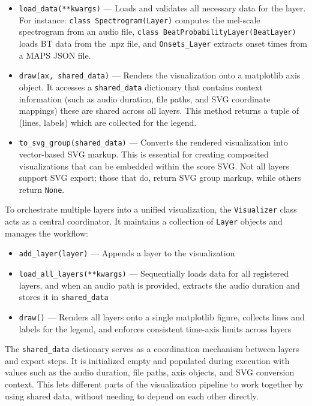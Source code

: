 \begin{itemize}
    \item \texttt{load\_data(**kwargs)} — Loads and validates all necessary data for the layer. For instance: \texttt{class Spectrogram(Layer)} computes the mel-scale spectrogram from an audio file, \texttt{class BeatProbabilityLayer(BeatLayer)} loads BT data from the .npz file, and \texttt{Onsets\_Layer} extracts onset times from a MAPS JSON file.
    \item \texttt{draw(ax, shared\_data)} — Renders the visualization onto a matplotlib axis object. It accesses a \texttt{shared\_data} dictionary that contains context information (such as audio duration, file paths, and SVG coordinate mappings) these are shared across all layers. This method returns a tuple of (lines, labels) which are collected for the legend.
    \item \texttt{to\_svg\_group(shared\_data)} — Converts the rendered visualization into vector-based SVG markup. This is essential for creating composited visualizations that can be embedded within the score SVG. Not all layers support SVG export; those that do, return SVG group markup, while others return \texttt{None}.
\end{itemize}

\noindent To orchestrate multiple layers into a unified visualization, the \texttt{Visualizer} class acts as a central coordinator. It maintains a collection of \texttt{Layer} objects and manages the workflow:
\begin{itemize}
\item \texttt{add\_layer(layer)} — Appends a layer to the visualization
\item \texttt{load\_all\_layers(**kwargs)} — Sequentially loads data for all registered layers, and when an audio path is provided, extracts the audio duration and stores it in \texttt{shared\_data}
\item \texttt{draw()} — Renders all layers onto a single matplotlib figure, collects lines and labels for the legend, and enforces consistent time-axis limits across layers
\end{itemize}

\noindent The \texttt{shared\_data} dictionary serves as a coordination mechanism between layers and export steps. It is initialized empty and populated during execution with values such as the audio duration, file paths, axis objects, and SVG conversion context. This lets different parts of the visualization pipeline to work together by using shared data, without needing to depend on each other directly.

